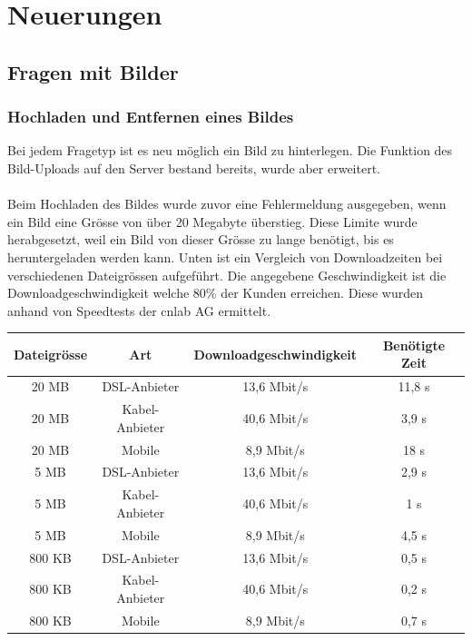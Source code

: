 \section{Neuerungen}

\subsection{Fragen mit Bilder}

\subsubsection{Hochladen und Entfernen eines Bildes}
\label{HochladenUndEntfernenEinesBildes}

Bei jedem Fragetyp ist es neu möglich ein Bild zu hinterlegen. Die Funktion des Bild-Uploads auf den Server bestand bereits, wurde aber erweitert.
\\
\\
Beim Hochladen des Bildes wurde zuvor eine Fehlermeldung ausgegeben, wenn ein Bild eine Grösse von über 20 Megabyte überstieg. Diese Limite wurde herabgesetzt, weil ein Bild von dieser Grösse zu lange benötigt, bis es heruntergeladen werden kann. Unten ist ein Vergleich von Downloadzeiten bei verschiedenen Dateigrössen aufgeführt. Die angegebene Geschwindigkeit ist die Downloadgeschwindigkeit welche 80\% der Kunden erreichen. Diese wurden anhand von Speedtests der cnlab AG \cite{cnlab_speedtest} ermittelt. \\


\begin{tabular}{|c|c|c|c|}
	\hline 
	Dateigrösse & Art & Downloadgeschwindigkeit & Benötigte Zeit \\ 
	\hline 
	20 MB & DSL-Anbieter & 13,6 Mbit/s & 11,8 s \\ 
	\hline 
	20 MB & Kabel-Anbieter & 40,6 Mbit/s & 3,9 s \\ 
	\hline 
	20 MB & Mobile & 8,9 Mbit/s & 18 s \\ 
	\hline 
	5 MB & DSL-Anbieter & 13,6 Mbit/s & 2,9 s \\ 
	\hline 
	5 MB & Kabel-Anbieter & 40,6 Mbit/s & 1 s \\ 
	\hline 
	5 MB & Mobile & 8,9 Mbit/s & 4,5 s \\ 
	\hline 
	800 KB & DSL-Anbieter & 13,6 Mbit/s & 0,5 s \\ 
	\hline 
	800 KB & Kabel-Anbieter & 40,6 Mbit/s & 0,2 s \\ 
	\hline 
	800 KB & Mobile & 8,9 Mbit/s & 0,7 s \\ 
	\hline 
\end{tabular}\\

